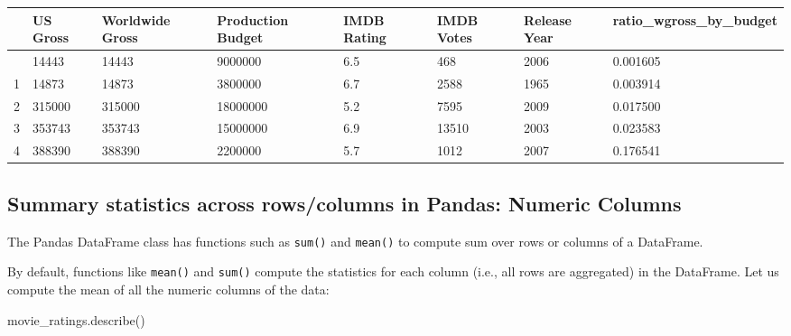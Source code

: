 \documentclass[
  letterpaper,
  DIV=11,
  numbers=noendperiod]{scrreprt}
\newenvironment{Shaded}{\begin{snugshade}}{\end{snugshade}}
\newcommand{\NormalTok}[1]{\textcolor[rgb]{0.00,0.23,0.31}{#1}}
\begin{document}
\begin{longtable}[]{@{}llllllll@{}}
\toprule\noalign{}
& US Gross & Worldwide Gross & Production Budget & IMDB Rating & IMDB
Votes & Release Year & ratio\_wgross\_by\_budget \\
\midrule\noalign{}
\endhead
\bottomrule\noalign{}
\endlastfoot
0 & 14443 & 14443 & 9000000 & 6.5 & 468 & 2006 & 0.001605 \\
1 & 14873 & 14873 & 3800000 & 6.7 & 2588 & 1965 & 0.003914 \\
2 & 315000 & 315000 & 18000000 & 5.2 & 7595 & 2009 & 0.017500 \\
3 & 353743 & 353743 & 15000000 & 6.9 & 13510 & 2003 & 0.023583 \\
4 & 388390 & 388390 & 2200000 & 5.7 & 1012 & 2007 & 0.176541 \\
\end{longtable}

\hypertarget{summary-statistics-across-rowscolumns-in-pandas-numeric-columns}{%
\subsection{Summary statistics across rows/columns in Pandas: Numeric
Columns}\label{summary-statistics-across-rowscolumns-in-pandas-numeric-columns}}

The Pandas DataFrame class has functions such as \texttt{sum()} and
\texttt{mean()} to compute sum over rows or columns of a DataFrame.

By default, functions like \texttt{mean()} and \texttt{sum()} compute
the statistics for each column (i.e., all rows are aggregated) in the
DataFrame. Let us compute the mean of all the numeric columns of the
data:

\begin{Shaded}
\begin{Highlighting}[]
\NormalTok{movie\_ratings.describe()}
\end{Highlighting}
\end{Shaded}
\end{document}
